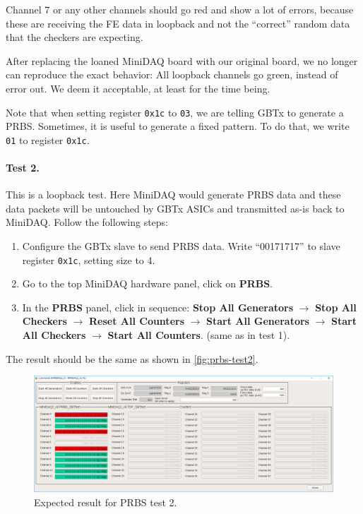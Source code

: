 \begin{leftbar}
    Channel 7 or any other channels should go red and show a lot of errors,
    because these are receiving the FE data in loopback and not the ``correct''
    random data that the checkers are expecting.
\end{leftbar}

After replacing the loaned MiniDAQ board with our original board, we no longer
can reproduce the exact behavior:
All loopback channels go green, instead of error out.
We deem it acceptable, at least for the time being.

\begin{leftbar}
    Note that when setting register \texttt{0x1c} to \texttt{03}, we are telling
    GBTx to generate a PRBS. Sometimes, it is useful to generate a fixed
    pattern. To do that, we write \texttt{01} to register \texttt{0x1c}.
\end{leftbar}

\paragraph{Test 2.}
This is a loopback test.
Here MiniDAQ would generate PRBS data and these data packets will be untouched
by GBTx ASICs and transmitted as-is back to MiniDAQ.
Follow the following steps:
\begin{enumerate}
    \item Configure the GBTx slave to send PRBS data. Write ``00171717'' to
        slave register \texttt{0x1c}, setting size to 4.
    \item Go to the top MiniDAQ hardware panel, click on \textbf{PRBS}.
    \item In the \textbf{PRBS} panel, click in sequence:
        \textbf{Stop All Generators} $\to$ \textbf{Stop All Checkers} $\to$
        \textbf{Reset All Counters} $\to$
        \textbf{Start All Generators} $\to$ \textbf{Start All Checkers} $\to$
        \textbf{Start All Counters}. (same as in test 1).
\end{enumerate}

The result should be the same as shown in \autoref{fig:prbs-test2}.

\begin{figure}[ht]
    \centering
    \includegraphics[width=\textwidth]{res/prbs_test2.png}
    \caption{Expected result for PRBS test 2.}
    \label{fig:prbs-test2}
\end{figure}

